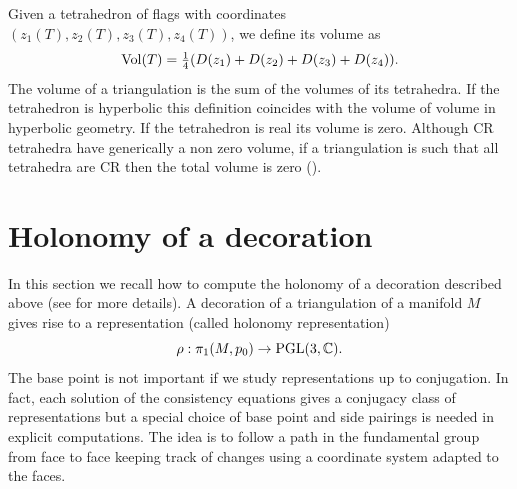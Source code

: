 Given a tetrahedron of flags with coordinates  $\left(z_{1}(T), z_{2}(T),z_{3}(T),z_{4}(T)\right)$, we define its volume as
$$
{\rm{Vol}}(T)=\frac{1}{4}(D(z_1)+D(z_2)+D(z_3)+D(z_4)).
$$
The volume of a triangulation is the sum of the volumes of its tetrahedra.  If the tetrahedron is hyperbolic this definition coincides with
the volume of volume in hyperbolic geometry.  If the  tetrahedron is real its volume is zero.  Although CR tetrahedra have generically a non zero volume, if a triangulation is such that
all tetrahedra are CR  then
the total  volume is zero (\cite{FWang}).

\section{Holonomy of a decoration}
\label{sec-holonomy}
In this section we recall how to compute the holonomy of a decoration described above (see \cite{BFG} for more details).
A decoration of a triangulation of a manifold $M$ gives rise to a representation (called holonomy representation)
$$
 \rho : \pi_1(M,p_0)  \rightarrow \textrm{PGL}(3,\mathbb{C}).
$$
The base point is not important if we study representations up to conjugation.  In fact, each solution of the consistency equations gives
a conjugacy class of representations but a special choice of base point and side pairings  is needed  in explicit computations.
The idea is to follow a path in the fundamental group from face to face keeping track of changes using a coordinate system adapted to the faces.


%

